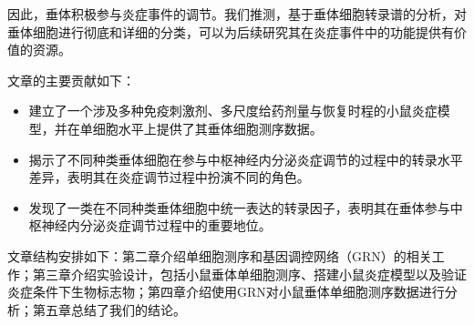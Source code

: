   因此，垂体积极参与炎症事件的调节。我们推测，基于垂体细胞转录谱的分析，对垂体细胞进行彻底和详细的分类，可以为后续研究其在炎症事件中的功能提供有价值的资源。

  文章的主要贡献如下：
\begin{itemize}
    \item 建立了一个涉及多种免疫刺激剂、多尺度给药剂量与恢复时程的小鼠炎症模型，并在单细胞水平上提供了其垂体细胞测序数据。
    \item 揭示了不同种类垂体细胞在参与中枢神经内分泌炎症调节的过程中的转录水平差异，表明其在炎症调节过程中扮演不同的角色。
    \item 发现了一类在不同种类垂体细胞中统一表达的转录因子，表明其在垂体参与中枢神经内分泌炎症调节过程中的重要地位。
\end{itemize}

  文章结构安排如下：第二章介绍单细胞测序和基因调控网络（GRN）的相关工作；第三章介绍实验设计，包括小鼠垂体单细胞测序、搭建小鼠炎症模型以及验证炎症条件下生物标志物；第四章介绍使用GRN对小鼠垂体单细胞测序数据进行分析；第五章总结了我们的结论。

